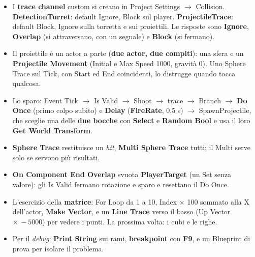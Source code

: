 \begin{itemize}
  \item I \textbf{trace channel} custom si creano in Project Settings $\rightarrow$
        Collision. \textbf{DetectionTurret}: default Ignore, Block sul player.
        \textbf{ProjectileTrace}: default Block, Ignore sulla torretta e sui proiettili.
        Le risposte sono \textbf{Ignore}, \textbf{Overlap} (si attraversano, con un
        segnale) e \textbf{Block} (si fermano).
  \item Il proiettile è un actor a parte (\textbf{due actor, due compiti}): una sfera e
        un \textbf{Projectile Movement} (Initial e Max Speed 1000, gravità 0). Uno Sphere
        Trace sul Tick, con Start ed End coincidenti, lo distrugge quando tocca qualcosa.
  \item Lo sparo: Event Tick $\rightarrow$ Is Valid $\rightarrow$ Shoot $\rightarrow$
        trace $\rightarrow$ Branch $\rightarrow$ \textbf{Do Once} (primo colpo subito) e
        \textbf{Delay} (\textbf{FireRate}, 0,5 s) $\rightarrow$ SpawnProjectile, che
        sceglie una delle \textbf{due bocche} con \textbf{Select} e \textbf{Random Bool} e
        usa il loro \textbf{Get World Transform}.
  \item \textbf{Sphere Trace} restituisce un \emph{hit}, \textbf{Multi Sphere Trace}
        tutti; il Multi serve solo se servono più risultati.
  \item \textbf{On Component End Overlap} svuota \textbf{PlayerTarget} (un Set senza
        valore): gli Is Valid fermano rotazione e sparo e resettano il Do Once.
  \item L'esercizio della \textbf{matrice}: For Loop da 1 a 10, Index $\times$ 100 sommato
        alla X dell'actor, \textbf{Make Vector}, e un \textbf{Line Trace} verso il basso
        (Up Vector $\times\,-5000$) per vedere i punti. La prossima volta: i cubi e le
        righe.
  \item Per il \emph{debug}: \textbf{Print String} sui rami, \textbf{breakpoint} con
        \textbf{F9}, e un Blueprint di prova per isolare il problema.
\end{itemize}
